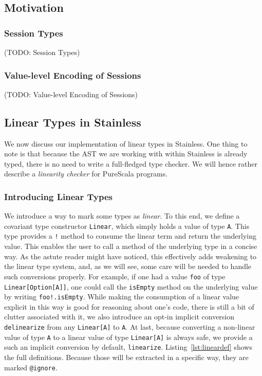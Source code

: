 \documentclass[a4paper,twoside]{article}
\newcommand{\TODO}[1]{\textcolor{YellowOrange}{(TODO: #1)}} %
\newcommand{\RefCode}[1]{Listing~\ref{#1}}
\newcommand{\stt}[1]{\texttt{\small{#1}}}
\begin{document}
\begin{enumerate}
\subsection{Motivation}

\subsubsection{Session Types}
\TODO{Session Types}

\subsubsection{Value-level Encoding of Sessions}
\TODO{Value-level Encoding of Sessions}

\subsection{Linear Types in Stainless}

\newcommand{\lin}[1]{\stt{Linear[#1]}}

We now discuss our implementation of linear types in Stainless. One thing to note is that because the AST we are working with within Stainless is already typed, there is no need to write a full-fledged type checker. We will hence rather describe a \textit{linearity checker} for PureScala programs.

\subsubsection*{Introducing Linear Types}

We introduce a way to mark some types as \textit{linear}. To this end, we define a covariant type constructor \stt{Linear}, which simply holds a value of type \stt{A}. This type provides a \stt{!} method to consume the linear term and return the underlying value. This enables the user to call a method of the underlying type in a concise way. As the astute reader might have noticed, this effectively adds weakening to the linear type system, and, as we will see, some care will be needed to handle such conversions properly. For example, if one had a value \stt{foo} of type \stt{Linear[Option[A]]}, one could call the \stt{isEmpty} method on the underlying value by writing \stt{foo!.isEmpty}. While making the consumption of a linear value explicit in this way is good for reasoning about one's code, there is still a bit of clutter associated with it, we also introduce an opt-in implicit conversion \stt{delinearize} from any \stt{Linear[A]} to \stt{A}. At last, because converting a non-linear value of type \stt{A} to a linear value of type \stt{Linear[A]} is always safe, we provide a such an implicit conversion by default, \stt{linearize}. \RefCode{lst:lineardef} shows the full definitions. Because those will be extracted in a specific way, they are marked \stt{@ignore}.


\end{enumerate}
\end{document}
